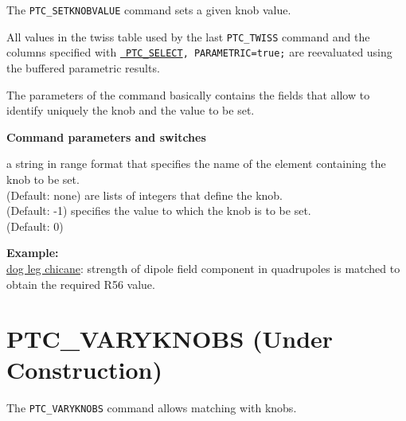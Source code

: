 The {\tt PTC\_SETKNOBVALUE} command sets a given knob value.


All values in the twiss table used by the last {\tt PTC\_TWISS} command 
and the columns specified with \hyperref[ptc_select]{\tt
  PTC\_SELECT}{\tt, PARAMETRIC=true;}  are reevaluated using the
buffered parametric results.   

The parameters of the command basically contains the fields that allow
to identify uniquely the knob and the value to be set.

{\bf Command parameters and switches}
\begin{madlist}
    a string in range format that specifies the name
   of the element containing the knob to be set. \\
     (Default: none) 
    are lists of integers that define the knob.\\
   (Default: -1)   
    specifies the value to which the knob is to be set.\\
   (Default: 0)\\
\end{madlist}

{\bf Example:}\\
\href{http://cern.ch/frs/mad-X_examples/ptc_madx_interface/matchknobs/matchknobs.madx}{dog
  leg chicane}: strength of dipole field component in quadrupoles is
matched to obtain the required R56 value.    


% 





%

\section{PTC\_VARYKNOBS (Under Construction)}
\label{sec:ptc_varyknobs}

The {\tt PTC\_VARYKNOBS} command allows matching with \ptc knobs.


